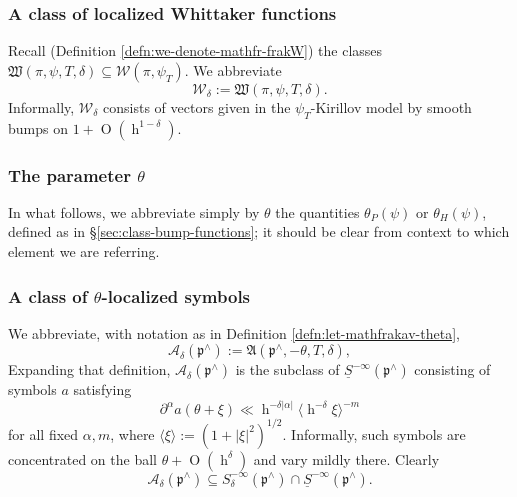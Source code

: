 \documentclass[reqno]{amsart}
\DeclareMathOperator{\h}{h}
\def\O{\operatorname{O}}
\theoremstyle{plain} \newtheorem{theorem} {Theorem}
\theoremstyle{definition} \newtheorem{definition} [theorem] {Definition}
\theoremstyle{itplain} %
\numberwithin{equation}{section}
\numberwithin{theorem}{section}
\begin{document}
\subsubsection{A class of localized Whittaker functions}
Recall (Definition \ref{defn:we-denote-mathfr-frakW}) the classes $\mathfrak{W}(\pi,\psi,T,\delta) \subseteq \mathcal{W}(\pi,\psi_T)$.  We abbreviate   
\begin{equation*}
  \mathcal{W}_\delta := \mathfrak{W}(\pi, \psi, T, \delta).
\end{equation*}
Informally, $\mathcal{W}_\delta$ consists of vectors given in the $\psi_T$-Kirillov model by smooth bumps on $1 + \O(\h^{1-\delta})$.

\subsubsection{The parameter $\theta$}
In what follows, we abbreviate simply by $\theta$ the quantities $\theta_P(\psi)$ or $\theta_H(\psi)$, defined as in \S\ref{sec:class-bump-functions}; it should be clear from context to which element we are referring.

\subsubsection{A class of $\theta$-localized symbols}
We abbreviate, with notation as in Definition \ref{defn:let-mathfrakav-theta},    
\begin{equation*}
  \mathcal{A}_\delta(\mathfrak{p}^\wedge) := \mathfrak{A}(\mathfrak{p}^\wedge, -\theta, T, \delta),
\end{equation*}
Expanding that definition, $\mathcal{A}_\delta(\mathfrak{p}^\wedge)$ is the subclass of $\underline{S}^{-\infty}(\mathfrak{p}^\wedge)$ consisting of symbols $a$ satisfying
\begin{equation}\label{eq:partialalpha-axi-ll}
  \partial^\alpha a(\theta + \xi) \ll \h^{-\delta |\alpha|} \langle \h^{-\delta} \xi \rangle^{-m}
\end{equation}
for all fixed $\alpha,m$, where $\langle \xi \rangle := (1 + |\xi|^2)^{1/2}$.  Informally, such symbols are concentrated on the ball $\theta + \O(\h^\delta)$ and vary mildly there.  Clearly
\begin{equation*}
  \mathcal{A}_{\delta}(\mathfrak{p}^\wedge) \subseteq S_{\delta}^{-\infty}(\mathfrak{p}^\wedge) \cap \underline{S}^{-\infty}(\mathfrak{p}^\wedge).
\end{equation*}
\end{document}
